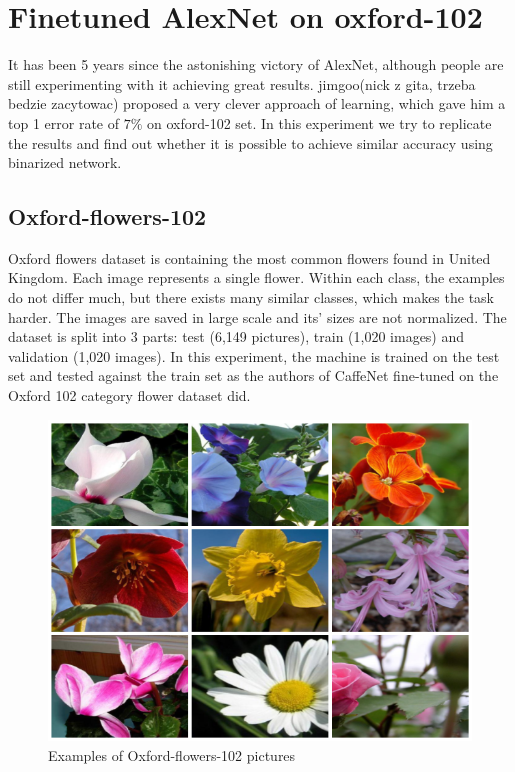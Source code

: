 \documentclass[licencjacka]{pracamgr}
\begin{document}
 	\section{Finetuned AlexNet on oxford-102}
 	It has been 5 years since the astonishing victory of AlexNet, although people are still experimenting with it achieving great results. jimgoo(nick z gita, trzeba bedzie zacytowac) proposed a very clever approach of learning, which gave him a top 1 error rate of $7\%$ on oxford-102 set. In this experiment we try to replicate the results and find out whether it is possible to achieve similar accuracy using binarized network. 
 		\subsection{Oxford-flowers-102}
 			Oxford flowers dataset is containing the most common flowers found in United Kingdom. Each image represents a single flower. Within each class, the examples do not differ much, but there exists many similar classes, which makes the task harder. The images are saved in large scale and its’ sizes are not normalized. The dataset is split into 3 parts: test (6,149 pictures), train (1,020 images) and validation (1,020 images). In this experiment, the machine is trained on the test set and tested against the train set as the authors of CaffeNet fine-tuned on the Oxford 102 category flower dataset did.
 			\begin{figure}[h]
				\caption{Examples of Oxford-flowers-102 pictures}
				\centering
				\includegraphics[width=\textwidth]{images/flowers}
			\end{figure}
\end{document}
